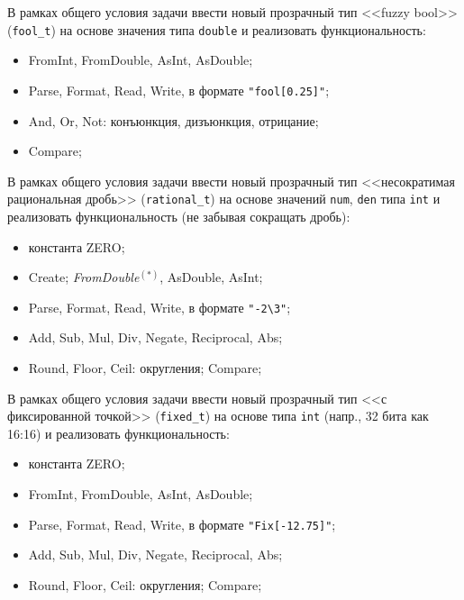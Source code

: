 
\begin{zztask}
В рамках общего условия задачи ввести новый прозрачный тип <<fuzzy bool>>
(\texttt{fool\_t}) на основе значения типа \texttt{double} и реализовать
функциональность:
%
\begin{itemize}
\item FromInt, FromDouble, AsInt, AsDouble;
\item Parse, Format, Read, Write, в формате \verb|"fool[0.25]"|;
\item And, Or, Not: конъюнкция, дизъюнкция, отрицание;
\item Compare;
\end{itemize}
\end{zztask}


\begin{zztask}
В рамках общего условия задачи ввести новый прозрачный тип <<несократимая рациональная
дробь>> (\texttt{rational\_t}) на основе значений \texttt{num}, \texttt{den}
типа \texttt{int} и реализовать функциональность (не забывая сокращать дробь):
%
\begin{itemize}
\item константа ZERO;
\item Create; \textit{FromDouble}${}^{(\ast)}$, AsDouble, AsInt;
\item Parse, Format, Read, Write, в формате \verb|"-2\3"|;
\item Add, Sub, Mul, Div, Negate, Reciprocal, Abs;
\item Round, Floor, Ceil: округления; Compare;
\end{itemize}
\end{zztask}


\begin{zztask}
В рамках общего условия задачи ввести новый прозрачный тип <<с фиксированной точкой>>
(\texttt{fixed\_t}) на основе типа \texttt{int} (напр., 32 бита как 16:16) и
реализовать функциональность:
%
\begin{itemize}
\item константа ZERO;
\item FromInt, FromDouble, AsInt, AsDouble;
\item Parse, Format, Read, Write, в формате \verb|"Fix[-12.75]"|;
\item Add, Sub, Mul, Div, Negate, Reciprocal, Abs;
\item Round, Floor, Ceil: округления; Compare;
\end{itemize}
\end{zztask}

